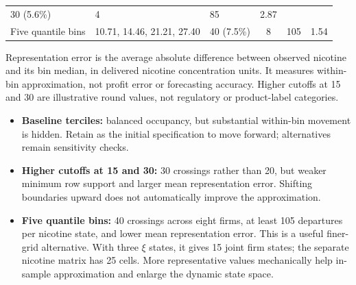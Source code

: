 \documentclass[10pt,]{article}
\providecommand{\tightlist}{%
  \setlength{\itemsep}{0pt}\setlength{\parskip}{0pt}}
\begin{document}
\begin{longtable}[]{@{}lllccc@{}}
\begin{minipage}[t]{0.10\columnwidth}
30 (5.6\%)\strut
\end{minipage} & \begin{minipage}[t]{0.10\columnwidth}\centering\strut
4\strut
\end{minipage} & \begin{minipage}[t]{0.19\columnwidth}\centering\strut
85\strut
\end{minipage} & \begin{minipage}[t]{0.22\columnwidth}\centering\strut
2.87\strut
\end{minipage}\tabularnewline
\begin{minipage}[t]{0.10\columnwidth}\raggedright\strut
Five quantile bins\strut
\end{minipage} & \begin{minipage}[t]{0.12\columnwidth}\raggedright\strut
10.71, 14.46, 21.21, 27.40\strut
\end{minipage} & \begin{minipage}[t]{0.10\columnwidth}\raggedright\strut
40 (7.5\%)\strut
\end{minipage} & \begin{minipage}[t]{0.10\columnwidth}\centering\strut
8\strut
\end{minipage} & \begin{minipage}[t]{0.19\columnwidth}\centering\strut
105\strut
\end{minipage} & \begin{minipage}[t]{0.22\columnwidth}\centering\strut
1.54\strut
\end{minipage}\tabularnewline
\bottomrule
\end{longtable}

Representation error is the average absolute difference between observed
nicotine and its bin median, in delivered nicotine concentration units.
It measures within-bin approximation, not profit error or forecasting
accuracy. Higher cutoffs at 15 and 30 are illustrative round values, not
regulatory or product-label categories.

\begin{itemize}
\tightlist
\item
  \textbf{Baseline terciles:} balanced occupancy, but substantial
  within-bin movement is hidden. Retain as the initial specification to
  move forward; alternatives remain sensitivity checks.
\item
  \textbf{Higher cutoffs at 15 and 30:} 30 crossings rather than 20, but
  weaker minimum row support and larger mean representation error.
  Shifting boundaries upward does not automatically improve the
  approximation.
\item
  \textbf{Five quantile bins:} 40 crossings across eight firms, at least
  105 departures per nicotine state, and lower mean representation
  error. This is a useful finer-grid alternative. With three \(\xi\)
  states, it gives 15 joint firm states; the separate nicotine matrix
  has 25 cells. More representative values mechanically help in-sample
  approximation and enlarge the dynamic state space.
\end{itemize}
\end{document}
